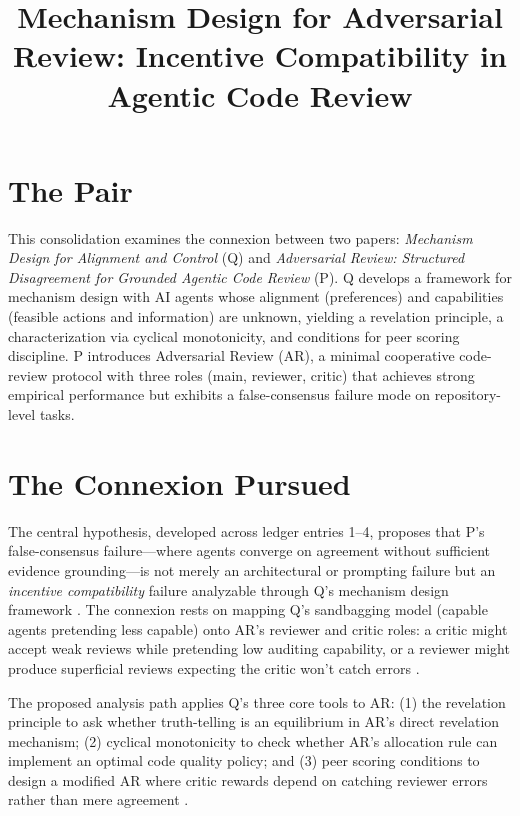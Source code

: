 \documentclass{article}
\title{Mechanism Design for Adversarial Review: Incentive Compatibility in Agentic Code Review}
\begin{document}
\maketitle

\section*{The Pair}

This consolidation examines the connexion between two papers: \emph{Mechanism Design for Alignment and Control} (Q) and \emph{Adversarial Review: Structured Disagreement for Grounded Agentic Code Review} (P). Q develops a framework for mechanism design with AI agents whose alignment (preferences) and capabilities (feasible actions and information) are unknown, yielding a revelation principle, a characterization via cyclical monotonicity, and conditions for peer scoring discipline. P introduces Adversarial Review (AR), a minimal cooperative code-review protocol with three roles (main, reviewer, critic) that achieves strong empirical performance but exhibits a false-consensus failure mode on repository-level tasks.

\section*{The Connexion Pursued}

The central hypothesis, developed across ledger entries 1--4, proposes that P's false-consensus failure---where agents converge on agreement without sufficient evidence grounding---is not merely an architectural or prompting failure but an \emph{incentive compatibility} failure analyzable through Q's mechanism design framework . The connexion rests on mapping Q's sandbagging model (capable agents pretending less capable) onto AR's reviewer and critic roles: a critic might accept weak reviews while pretending low auditing capability, or a reviewer might produce superficial reviews expecting the critic won't catch errors .

The proposed analysis path applies Q's three core tools to AR: (1) the revelation principle to ask whether truth-telling is an equilibrium in AR's direct revelation mechanism; (2) cyclical monotonicity to check whether AR's allocation rule can implement an optimal code quality policy; and (3) peer scoring conditions to design a modified AR where critic rewards depend on catching reviewer errors rather than mere agreement .
\end{document}
